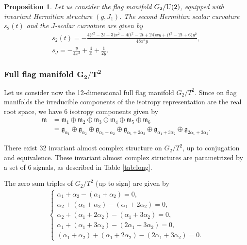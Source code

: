 \documentclass[pdftex]{sigma}%
\numberwithin{equation}{section}
\newtheorem{Proposition}[Theorem]{Proposition}
 { \theoremstyle{definition}
\newtheorem{Definition}[Theorem]{Definition}
\newtheorem{Question}[Theorem]{Question}
\newtheorem*{Notation}{Notation}
\newtheorem{Example}[Theorem]{Example}
\newtheorem{Remark}[Theorem]{Remark} }
\begin{document}
\begin{Proposition}
Let us consider the flag manifold $G_2/{\rm U}(2)$, equipped with invariant Hermitian structure $(g, J_{1})$. The second Hermitian scalar curvature $s_2(t)$ and the $J$-scalar curvature are given by
\begin{gather*}
s_{2}(t)=-\frac{4 \big(t^2-2 t-3\big) x^2-4 \big(t^2-2 t+24\big) x y+\big(t^2-2 t+6\big) y^2}{48 x^2 y},
\\
s_{J}=-\frac{y}{4 x^2}+\frac{4}{x}+\frac{1}{2 y}.
\end{gather*}
\end{Proposition}

\subsubsection[Full flag manifold \protect{$G\textunderscore{}2/T\textasciicircum{}2$}]
{Full flag manifold $\boldsymbol{G_2/T^2}$} \label{g2-full}
Let us consider now the 12-dimensional full flag manifold $G_2/T^2$. Since on flag manifolds the irreducible components of the isotropy representation are the real root space, we have 6 isotropy components given by
\begin{align*}
\mathfrak{m}&=\mathfrak{m_{1}}\oplus\mathfrak{m_{2}}\oplus\mathfrak{m_{3}} \oplus\mathfrak{m_{4}}\oplus\mathfrak{m_{5}}\oplus\mathfrak{m_{6}}
\\
&=\mathfrak{g}_{\alpha_{1}}\oplus\mathfrak{g}_{\alpha_{2}}\oplus\mathfrak{g}_{\alpha_{1} +\alpha_{2}}\oplus\mathfrak{g}_{\alpha_{1}+2\alpha_{2}}\oplus \mathfrak{g}_{\alpha_{1}+3\alpha_{2}}\oplus\mathfrak{g}_{2\alpha_{1}+3\alpha_{2}}.
\end{align*}

There exist 32 invariant almost complex structure on $G_2/T^2$, up to conjugation and equivalence. These invariant almost complex structures are parametrized by a set of 6 signals, as described in Table \ref{tab:long}.



The zero sum triples of $G_2/T^2$ (up to sign) are given by
\begin{gather} \label{tripla-soma-zero-g2}
\begin{cases}
 \alpha_{1}+\alpha_{2}-(\alpha_{1}+\alpha_{2})=0,
 \\
 \alpha_{2}+(\alpha_{1}+\alpha_{2})-(\alpha_{1}+2\alpha_{2})=0,
 \\
 \alpha_{2}+(\alpha_{1}+2\alpha_{2})-(\alpha_{1}+3\alpha_{2})=0,
 \\
 \alpha_{1}+(\alpha_{1}+3\alpha_{2})-(2\alpha_{1}+3\alpha_{2})=0,
 \\
 (\alpha_{1}+\alpha_{2})+(\alpha_{1}+2\alpha_{2})-(2\alpha_{1}+3\alpha_{2})=0.
\end{cases}
\end{gather}
\end{document}
